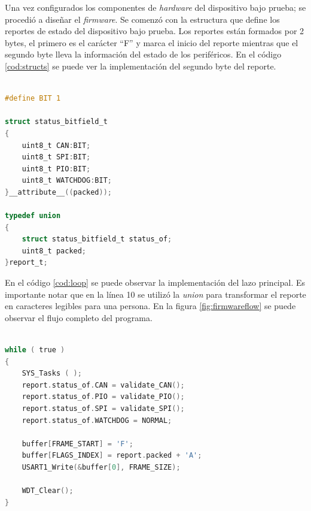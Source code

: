\newpage

Una vez configurados los componentes de \emph{hardware} del dispositivo bajo prueba; se procedió a diseñar el \emph{firmware}.
Se comenzó con la estructura que define los reportes de estado del dispositivo bajo prueba.
Los reportes están formados por 2 bytes, el primero es el carácter ``F'' y marca el inicio del reporte mientras que el segundo byte lleva la información del estado de los periféricos.
En el código \ref{cod:structs} se puede ver la implementación del segundo byte del reporte.

\begin{lstlisting}[language=C,label=cod:structs,caption=Definición de la estructura de reportes.]  % Start your code-block

#define BIT 1

struct status_bitfield_t
{
    uint8_t CAN:BIT;
    uint8_t SPI:BIT;
    uint8_t PIO:BIT;
    uint8_t WATCHDOG:BIT;
}__attribute__((packed));

typedef union
{
    struct status_bitfield_t status_of;
    uint8_t packed;
}report_t;

\end{lstlisting}

En el código \ref{cod:loop} se puede observar la implementación del lazo principal.
Es importante notar que en la línea 10 se utilizó la \emph{union} para transformar el reporte en caracteres legibles para una persona.
En la figura \ref{fig:firmwareflow} se puede observar el flujo completo del programa.

\begin{lstlisting}[language=C,label=cod:loop,caption=Lazo principal del \emph{firmware} de autoevaluación.]  % Start your code-block

while ( true )
{
    SYS_Tasks ( );
    report.status_of.CAN = validate_CAN();
    report.status_of.PIO = validate_PIO();
    report.status_of.SPI = validate_SPI();
    report.status_of.WATCHDOG = NORMAL;
    
    buffer[FRAME_START] = 'F';
    buffer[FLAGS_INDEX] = report.packed + 'A';
    USART1_Write(&buffer[0], FRAME_SIZE);
    
    WDT_Clear();
}

\end{lstlisting}

